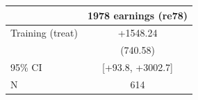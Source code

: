 \begin{tabular}{lc}
\toprule
 & 1978 earnings (re78) \\
\midrule
Training (treat) & +1548.24 \\
                  & (740.58) \\
95\% CI           & [+93.8, +3002.7] \\
N                & 614 \\
\bottomrule
\end{tabular}
